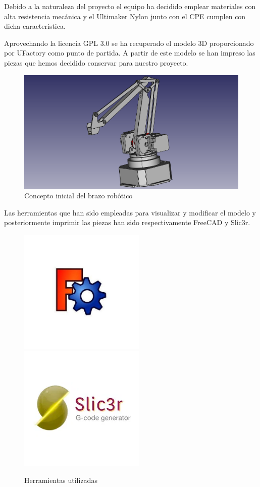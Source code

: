 Debido a la naturaleza del proyecto el equipo ha decidido emplear materiales con alta resistencia mecánica y el Ultimaker Nylon junto con el CPE cumplen con dicha característica.

Aprovechando la licencia GPL 3.0 se ha recuperado el modelo 3D proporcionado por UFactory como punto de partida. A partir de este modelo se han impreso las piezas que hemos decidido conservar para nuestro proyecto.

\begin{figure}[H]
    \centering
    \includegraphics[width=12cm]{pictures/brazo_vista_3d_inicial.png}
    \caption{Concepto inicial del brazo robótico}
    \label{fig:manipulador_inicial}
\end{figure}

Las herramientas que han sido empleadas para visualizar y modificar el modelo y posteriormente imprimir las piezas han sido respectivamente FreeCAD y Slic3r.

\begin{figure}[H]
    \centering
    \includegraphics[width=6cm]{pictures/freeCAD.jpg}
    \includegraphics[width=6cm]{pictures/slic3r_logo.jpg}
    \caption{Herramientas utilizadas}
    \label{fig:herramientas_3d}
\end{figure}

